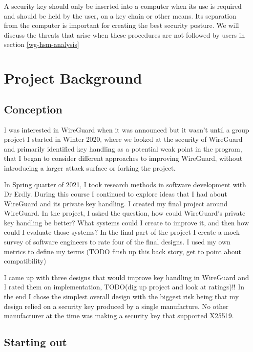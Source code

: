 \documentclass [11pt, proquest] {uwthesis}[2020/02/24]
\begin{document}
A security key should only be inserted into a computer when its use is required and should be held by the user, on a key chain or other means. Its separation from the computer is important for creating the best security posture. We will discuss the threats that arise when these procedures are not followed by users in section \ref{wg-hsm-analysis}

\chapter {Project Background}

\section {Conception}
I was interested in WireGuard when it was announced but it wasn't until a group project I started in Winter 2020, where we looked at the security of WireGuard and primarily identified key handling as a potential weak point in the program, that I began to consider different approaches to improving WireGuard,  without introducing a larger attack surface or forking the project. 

In Spring quarter of 2021, I took research methods in software development with Dr Erdly. During this course I continued to explore ideas that I had about WireGuard and its private key handling. I created my final project around WireGuard. In the project, I asked the question, how could WireGuard's private key handling be better? What systems could I create to improve it, and then how could I evaluate those systems?  
In the final part of the project I create a mock survey of software engineers to rate four of the final designs. I used my own metrics to define my terms (TODO finsh up this back story, get to point about compatibility)

I came up with three designs that would improve key handling in WireGuard and I rated them on implementation, TODO(dig up project and look at ratings)!! In the end I chose the simplest overall design with the biggest risk being that my design relied on a security key produced by a single manufacture. No other manufacturer at the time was making a security key that supported X25519.

\section{Starting out}
\end{document}
